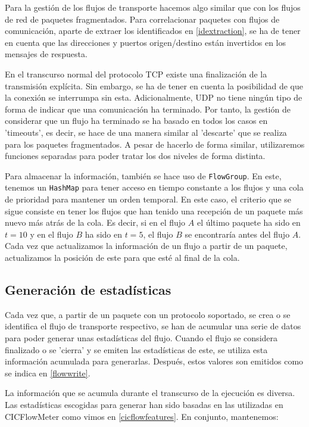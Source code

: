 Para la gestión de los flujos de transporte hacemos algo similar que con los flujos de red de paquetes fragmentados. Para correlacionar paquetes con flujos de comunicación, aparte de extraer los identificados en \ref{idextraction}, se ha de tener en cuenta que las direcciones y puertos origen/destino están invertidos en los mensajes de respuesta.

En el transcurso normal del protocolo TCP existe una finalización de la transmisión explícita. Sin embargo, se ha de tener en cuenta la posibilidad de que la conexión se interrumpa sin esta. Adicionalmente, UDP no tiene ningún tipo de forma de indicar que una comunicación ha terminado. Por tanto, la gestión de considerar que un flujo ha terminado se ha basado en todos los casos en 'timeouts', es decir, se hace de una manera similar al 'descarte' que se realiza para los paquetes fragmentados. A pesar de hacerlo de forma similar, utilizaremos funciones separadas para poder tratar los dos niveles de forma distinta.

Para almacenar la información, también se hace uso de \texttt{FlowGroup}. En este, tenemos un \texttt{HashMap} para tener acceso en tiempo constante a los flujos y una cola de prioridad para mantener un orden temporal. En este caso, el criterio que se sigue consiste en tener los flujos que han tenido una recepción de un paquete más nuevo más atrás de la cola. Es decir, si en el flujo $A$ el último paquete ha sido en $t=10$ y en el flujo $B$ ha sido en $t=5$, el flujo $B$ se encontraría antes del flujo $A$. Cada vez que actualizamos la información de un flujo a partir de un paquete, actualizamos la posición de este para que esté al final de la cola.

\subsection{Generación de estadísticas} \label{statsgen}

Cada vez que, a partir de un paquete con un protocolo soportado, se crea o se identifica el flujo de transporte respectivo, se han de acumular una serie de datos para poder generar unas estadísticas del flujo. Cuando el flujo se considera finalizado o se 'cierra' y se emiten las estadísticas de este, se utiliza esta información acumulada para generarlas. Después, estos valores son emitidos como se indica en \ref{flowwrite}.

La información que se acumula durante el transcurso de la ejecución es diversa. Las estadísticas escogidas para generar han sido basadas en las utilizadas en CICFlowMeter como vimos en \ref{cicflowfeatures}. En conjunto, mantenemos:

